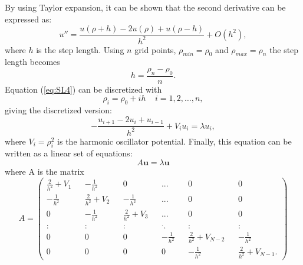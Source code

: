 \documentclass[10pt,a4paper,titlepage]{article}
\begin{document}
By using Taylor expansion, it can be shown that the second derivative can be expressed as:
\begin{equation}
\label{eq:secondiff}
    u''=\frac{u(\rho+h) -2u(\rho) +u(\rho-h)}{h^2} +O(h^2),
\end{equation}
where $h$ is the step length. Using $n$ grid points, $\rho_{min}=\rho_{0}$ and $\rho_{max}=\rho_{n}$ the step length becomes\begin{equation}
\label{eq:steplength}
  h=\frac{\rho_n-\rho_0 }{n}.
\end{equation}
Equation (\ref{eq:SL4}) can be discretized with
\begin{equation}
\rho_i= \rho_0 + ih \ \ \ \ \ i=1,2,\dots , n,
\end{equation}
giving the discretized version:
\begin{equation}
\label{eq:SL_disc1}
-\frac{u_{i+1} -2u_i +u_{i-1} }{h^2}+V_iu_i  = \lambda u_i,
\end{equation}
where $V_{i}=\rho_{i}^{2}$ is the harmonic oscillator potential.
Finally, this equation can be written as a linear set of equations:
\begin{equation}
A\mathbf{u}=\lambda\mathbf{u}
\end{equation}
where A is the matrix
\setcounter{MaxMatrixCols}{20}
\begin{equation}
A=\begin{pmatrix}
\frac{2}{h^2} + V_1 && -\frac{1}{h^2} && 0 && ... && 0 && 0 \\
-\frac{1}{h^2} && \frac{2}{h^2} + V_2 && -\frac{1}{h^2} && ... && 0 && 0 \\
0 && -\frac{1}{h^2} && \frac{2}{h^2} + V_3 && ... && 0 && 0 \\
: && : && : && ^{\textbf{.}}. && : && : \\
0 && 0 && 0 && -\frac{1}{h^2} && \frac{2}{h^2} + V_{N-2} && -\frac{1}{h^2} \\
0 && 0 && 0 && 0 && -\frac{1}{h^2} && \frac{2}{h^2} + V_{N-1}.
\end{pmatrix}
\label{eq:A}
\end{equation}
\end{document}
